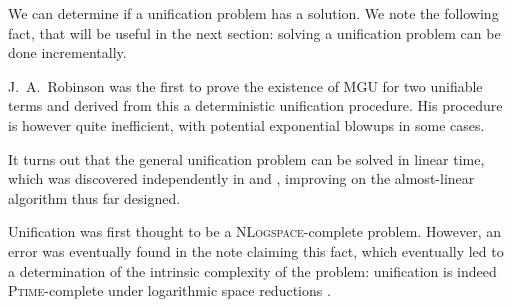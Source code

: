 We can determine if a unification problem has a solution. We note the following fact, that will be useful in the next section: solving a unification problem can be done incrementally.

\smallskip
{}





J.~A.~Robinson was the first to prove the existence of MGU for two unifiable terms and derived from this a deterministic unification procedure.%
His procedure is however quite inefficient, with potential exponential blowups in some cases. 

\smallskip
It turns out that the general unification problem can be solved in linear time, which was discovered independently in \cite{paterson_linear_1978} and \cite{martelli_unification_1976}, improving on the almost-linear algorithm thus far designed.

\smallskip
Unification was first thought to be a \textsc{NLogspace}-complete problem. However, an error was eventually found in the note \cite{lewis_unifiability_1982} claiming this fact, which eventually led to a determination of the intrinsic complexity of the problem: unification is indeed \textsc{Ptime}-complete under logarithmic space reductions \cite{dwork_sequential_1984}.

